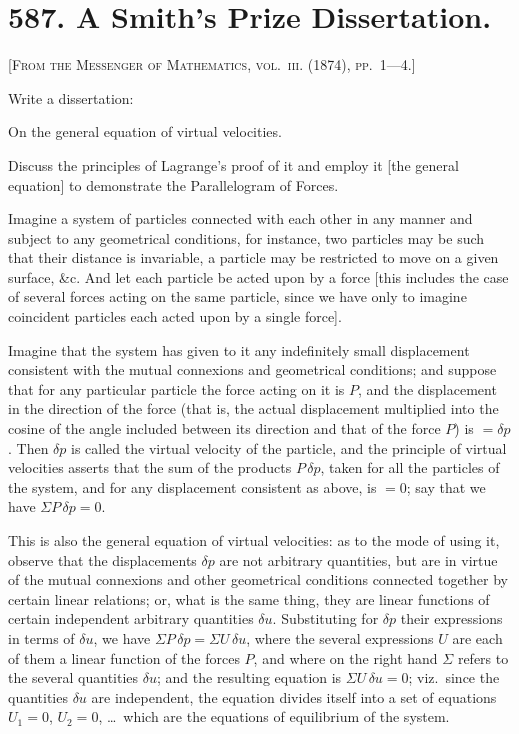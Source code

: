 \documentclass[11pt,a4paper]{article}
\theoremstyle{plain}
\theoremstyle{definition}
\theoremstyle{remark}
\begin{document}
\section*{587. A Smith's Prize Dissertation.}

\noindent\textsc{[From the Messenger of Mathematics, vol.~\textsc{iii}. (1874), pp.~1---4.]}

\medskip

\noindent Write a dissertation:

\smallskip

On the general equation of virtual velocities.

Discuss the principles of Lagrange's proof of it and employ it [the general equation] to demonstrate the Parallelogram of Forces.

\medskip

Imagine a system of particles connected with each other in any manner and subject to any geometrical conditions, for instance, two particles may be such that their distance is invariable, a particle may be restricted to move on a given surface, \&c. And let each particle be acted upon by a force [this includes the case of several forces acting on the same particle, since we have only to imagine coincident particles each acted upon by a single force].

Imagine that the system has given to it any indefinitely small displacement consistent with the mutual connexions and geometrical conditions; and suppose that for any particular particle the force acting on it is $P$, and the displacement in the direction of the force (that is, the actual displacement multiplied into the cosine of the angle included between its direction and that of the force $P$) is $=\delta p$. Then $\delta p$ is called the virtual velocity of the particle, and the principle of virtual velocities asserts that the sum of the products $P\,\delta p$, taken for all the particles of the system, and for any displacement consistent as above, is $=0$; say that we have $\Sigma P\,\delta p = 0$.

This is also the general equation of virtual velocities: as to the mode of using it, observe that the displacements $\delta p$ are not arbitrary quantities, but are in virtue of the mutual connexions and other geometrical conditions connected together by certain linear relations; or, what is the same thing, they are linear functions of certain independent arbitrary quantities $\delta u$. Substituting for $\delta p$ their expressions in terms of $\delta u$, we have $\Sigma P\,\delta p = \Sigma U\,\delta u$, where the several expressions $U$ are each of them a linear function of the forces $P$, and where on the right hand $\Sigma$ refers to the several quantities $\delta u$; and the resulting equation is $\Sigma U\,\delta u = 0$; viz.\ since the quantities $\delta u$ are independent, the equation divides itself into a set of equations $U_1 = 0$, $U_2 = 0$, \ldots\ which are the equations of equilibrium of the system.
\end{document}
